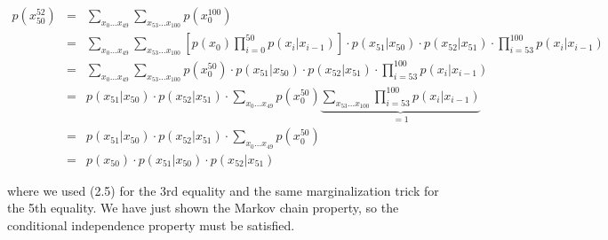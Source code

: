 \documentclass[6008notes.tex]{subfiles}
\begin{document}
\begin{eqnarray*}
		p(x_{50}^{52})
        &=& \sum_{x_{0} \dots x_{49}} \sum_{x_{53} \dots x_{100}} p(x_{0}^{100}) \\
		&=& \sum_{x_{0} \dots x_{49}} \sum_{x_{53} \dots x_{100}} \left[p(x_{0}) \prod_{i=0}^{50} p(x_{i}|x_{i-1})\right] \cdot p(x_{51}|x_{50}) \cdot p(x_{52}|x_{51}) \cdot \prod_{i=53}^{100} p(x_{i}|x_{i-1}) \\
		&=& \sum_{x_{0} \dots x_{49}} \sum_{x_{53} \dots x_{100}} p(x_{0}^{50}) \cdot p(x_{51}|x_{50}) \cdot p(x_{52}|x_{51}) \cdot \prod_{i=53}^{100} p(x_{i}|x_{i-1}) \\
		&=& p(x_{51}|x_{50}) \cdot p(x_{52}|x_{51}) \cdot \sum_{x_{0} \dots x_{49}} p(x_{0}^{50}) \underbrace{\sum_{x_{53} \dots x_{100}} \prod_{i=53}^{100} p(x_{i}|x_{i-1})}_{=1} \\
		&=& p(x_{51}|x_{50}) \cdot p(x_{52}|x_{51}) \cdot \sum_{x_{0} \dots x_{49}} p(x_{0}^{50}) \\
		&=& p(x_{50}) \cdot p(x_{51}|x_{50}) \cdot p(x_{52}|x_{51})
    \end{eqnarray*}
		
where we used (2.5) for the 3rd equality and the same marginalization trick for the 5th equality. We have just shown the Markov chain property, so the conditional independence property must be satisfied.
\end{document}
